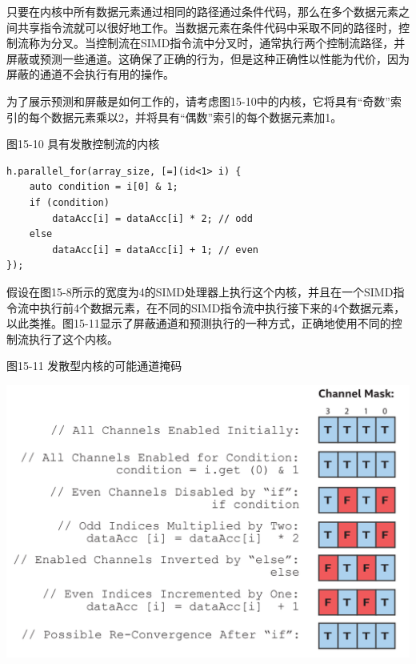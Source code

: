 只要在内核中所有数据元素通过相同的路径通过条件代码，那么在多个数据元素之间共享指令流就可以很好地工作。当数据元素在条件代码中采取不同的路径时，控制流称为分叉。当控制流在SIMD指令流中分叉时，通常执行两个控制流路径，并屏蔽或预测一些通道。这确保了正确的行为，但是这种正确性以性能为代价，因为屏蔽的通道不会执行有用的操作。\par

为了展示预测和屏蔽是如何工作的，请考虑图15-10中的内核，它将具有“奇数”索引的每个数据元素乘以2，并将具有“偶数”索引的每个数据元素加1。\par

\hspace*{\fill} \par %
图15-10 具有发散控制流的内核
\begin{lstlisting}[caption={}]
h.parallel_for(array_size, [=](id<1> i) {
	auto condition = i[0] & 1;
	if (condition)
		dataAcc[i] = dataAcc[i] * 2; // odd
	else
		dataAcc[i] = dataAcc[i] + 1; // even
});
\end{lstlisting}

假设在图15-8所示的宽度为4的SIMD处理器上执行这个内核，并且在一个SIMD指令流中执行前4个数据元素，在不同的SIMD指令流中执行接下来的4个数据元素，以此类推。图15-11显示了屏蔽通道和预测执行的一种方式，正确地使用不同的控制流执行了这个内核。\par

\hspace*{\fill} \par %
图15-11 发散型内核的可能通道掩码
\begin{center}
	\includegraphics[width=1.0\textwidth]{content/chapter-15/images/8}
\end{center}

